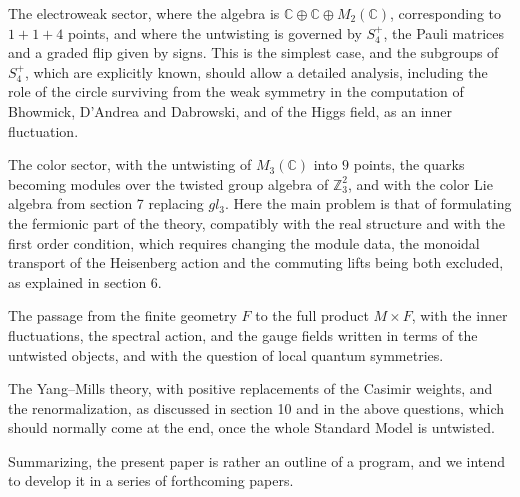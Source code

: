 \documentclass[11pt]{amsart}
\theoremstyle{definition}
\begin{document}
\medskip

 The electroweak sector, where the algebra is $\mathbb C\oplus\mathbb C\oplus M_2(\mathbb C)$, corresponding to $1+1+4$ points, and where the untwisting is governed by $S_4^+$, the Pauli matrices and a graded flip given by signs. This is the simplest case, and the subgroups of $S_4^+$, which are explicitly known, should allow a detailed analysis, including the role of the circle surviving from the weak symmetry in the computation of Bhowmick, D'Andrea and Dabrowski, and of the Higgs field, as an inner fluctuation.

\medskip

 The color sector, with the untwisting of $M_3(\mathbb C)$ into $9$ points, the quarks becoming modules over the twisted group algebra of $\mathbb Z_3^2$, and with the color Lie algebra from section 7 replacing $gl_3$. Here the main problem is that of formulating the fermionic part of the theory, compatibly with the real structure and with the first order condition, which requires changing the module data, the monoidal transport of the Heisenberg action and the commuting lifts being both excluded, as explained in section 6.

\medskip

 The passage from the finite geometry $F$ to the full product $M\times F$, with the inner fluctuations, the spectral action, and the gauge fields written in terms of the untwisted objects, and with the question of local quantum symmetries.

\medskip

 The Yang--Mills theory, with positive replacements of the Casimir weights, and the renormalization, as discussed in section 10 and in the above questions, which should normally come at the end, once the whole Standard Model is untwisted.

\medskip


Summarizing, the present paper is rather an outline of a program, and we intend to develop it in a series of forthcoming papers.
\end{document}
